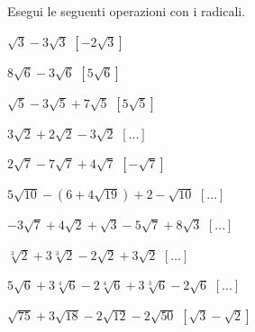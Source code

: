 \subsubsection*{}

\begin{esercizio}[\Ast]
 \label{ese:2.50}
Esegui le seguenti operazioni con i radicali.
 \begin{multicols}{2}
 \begin{enumeratea}
 \item $\sqrt 3-3\sqrt 3$
  \hfill $\left[-2 \sqrt{3}\right]$
 \item $8\sqrt 6-3\sqrt 6$
  \hfill $\left[5\sqrt 6\right]$
 \item $\sqrt 5-3\sqrt 5+7\sqrt 5$
  \hfill $\left[5 \sqrt{5}\right]$
 \item $3\sqrt 2+2\sqrt 2-3\sqrt 2$
  \hfill $\left[...\right]$
 \item $2\sqrt 7-7\sqrt 7+4\sqrt 7$
  \hfill $\left[-\sqrt 7\right]$
 \item $5\sqrt{10}-\left(6+4\sqrt{19}\right)+2-\sqrt{10}$
  \hfill $\left[...\right]$
 \item $-3\sqrt 7+4\sqrt 2+\sqrt 3-5\sqrt 7+8\sqrt 3$
  \hfill $\left[...\right]$
 \item $\sqrt[3]2+3\sqrt[3]2-2\sqrt 2+3\sqrt 2$
  \hfill $\left[...\right]$
 \item $5\sqrt 6+3\sqrt[4]6-2\sqrt[4]6+3\sqrt[3]6-2\sqrt 6$
  \hfill $\left[...\right]$
 \item $\sqrt{75}+3\sqrt{18}-2\sqrt{12}-2\sqrt{50}$
  \hfill $\left[\sqrt 3-\sqrt 2\right]$
 \end{enumeratea}
 \end{multicols}
\end{esercizio}

